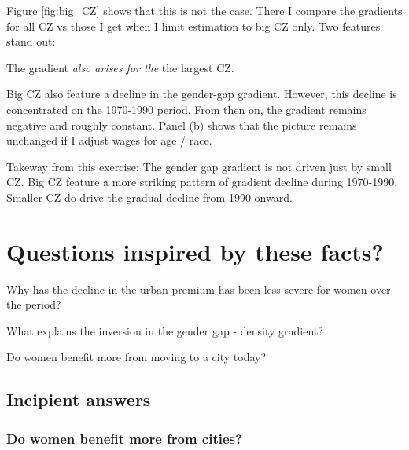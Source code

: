Figure \ref{fig:big_CZ} shows that this is not the case. There I compare the gradients for all CZ vs those I get when I limit estimation to big CZ only. Two features stand out:
\benu
	\item The gradient \textit{also arises for the} the largest CZ.
	\item Big CZ also feature a decline in the gender-gap gradient. However, this decline is concentrated on the 1970-1990 period. From then on, the gradient remains negative and roughly constant. Panel (b) shows that the picture remains unchanged if I adjust wages for age / race.
\eenu

\begin{block}{Takeway from this exercise:}
	The gender gap gradient is not driven just by small CZ. Big CZ feature a more striking pattern of gradient decline during 1970-1990. Smaller CZ do drive the gradual decline from 1990 onward.
\end{block}



\section{Questions inspired by these facts?}
\bitem
	\item Why has the decline in the urban premium has been less severe for women over the period?
	\item What explains the inversion in the gender gap - density gradient?
	\item Do women benefit more from moving to a city today?
\eitem


\subsection{Incipient answers}
\subsubsection{Do women benefit more from cities?}

